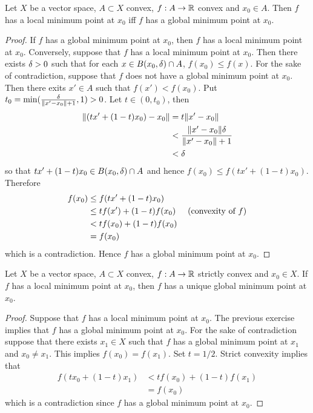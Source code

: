 \documentclass{book}
\begin{document}
	\begin{ex} 
	Let $X$ be a vector space, $A \subset X$ convex, $f:A \rightarrow \mathbb{R}$ convex and $x_0 \in A$. Then $f$ has a local minimum point at $x_0$ iff $f$ has a global minimum point at $x_0$.
	\end{ex}	
	
	\begin{proof}
	If $f$ has a global minimum point at $x_0$, then $f$ has a local minimum point at $x_0$. Conversely, suppose that $f$ has a local minimum point at $x_0$. Then there exists $\delta >0$ such that for each $x \in B(x_0, \delta) \cap A$, $f(x_0) \leq f(x)$. For the sake of contradiction, suppose that $f$ does not have a global minimum point at $x_0$. Then there exits $x' \in A$ such that $f(x') < f(x_0)$. Put $t_0 = \min(\frac{\delta}{\|x' - x_0\| + 1}, 1) >0$. Let $t \in (0, t_0)$, then
	\begin{align*}
	\|(tx' + (1-t)x_0) - x_0\| 
	&= t\|x' -x_0 \| \\
	& <   \frac{\|x' -x_0 \|\delta}{\|x' -x_0\| + 1} \\
	& < \delta
	\end{align*} 
	so that $tx' + (1-t)x_0 \in B(x_0, \delta) \cap A$ and hence $f(x_0) \leq f(tx' + (1-t)x_0)$.  Therefore  
	\begin{align*}
	f(x_0) 
	& \leq f(tx' + (1-t)x_0) \\
	& \leq tf(x') + (1-t)f(x_0)  \hspace{.5cm} (\text{convexity of }f)\\
	& < tf(x_0) + (1-t)f(x_0) \\
	&= f(x_0)
	\end{align*}
	which is a contradiction. Hence $f$ has a global minimum point at $x_0$.
	\end{proof}
	
	\begin{ex} 
	Let $X$ be a vector space, $A \subset X$ convex, $f:A \rightarrow \mathbb{R}$ strictly convex and $x_0 \in X$. If $f$ has a local minimum point at $x_0$, then $f$ has a unique global minimum point at $x_0$.  
	\end{ex}
	
	\begin{proof}
	Suppose that $f$ has a local minimum point at $x_0$. The previous exercise implies that $f$ has a global minimum point at $x_0$. For the sake of contradiction suppose that there exists $x_1 \in X$ such that $f$ has a global minimum point at $x_1$ and $x_0 \neq x_1$. This implies $f(x_0) = f(x_1)$. Set $t = 1/2$. Strict convexity implies that 
	\begin{align*}
	f(tx_0 + (1-t)x_1) 
	&< tf(x_0) + (1-t)f(x_1)  \\
	&= f(x_0) 
	\end{align*}
	which is a contradiction since $f$ has a global minimum point at $x_0$.
	\end{proof}
\end{document}
